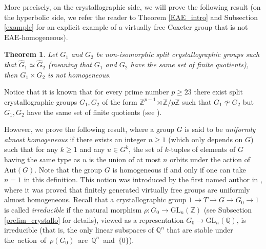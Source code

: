 \documentclass[a4paper, 11pt]{amsart}
\newtheorem{te}{Theorem}[section]
\theoremstyle{definition}
\theoremstyle{remark}
\renewcommand{\geq}{\geqslant}
\begin{document}

More precisely, on the crystallographic side, we will prove the following result (on the hyperbolic side, we refer the reader to Theorem \ref{EAE_intro} and Subsection \ref{example} for an explicit example of a virtually free Coxeter group that is not $\mathrm{EAE}$-homogeneous).

\begin{te}\label{counterexample_theorem}Let $G_1$ and $G_2$ be non-isomorphic split crystallographic groups such that $\widehat{G}_1\simeq \widehat{G}_2$ (meaning that $G_1$ and $G_2$ have the same set of finite quotients), then $G_1 \times G_2$ is not homogeneous.\end{te}

Notice that it is known that for every prime number $p \geq 23$ there exist split crystallographic groups $G_1,G_2$ of the form $\mathbb{Z}^{p-1} \rtimes\mathbb{Z}/p\mathbb{Z}$ such that $G_1\not\simeq G_2$ but $G_1,G_2$ have the same set of finite quotients (see \cite{bri,FNP}). 

\smallskip

However, we prove the following result, where a group $G$ is said to be \emph{uniformly almost homogeneous} if there exists an integer $n\geq 1$ (which only depends on $G$) such that for any $k\geq 1$ and any $u\in G^k$, the set of $k$-tuples of elements of $G$ having the same type as $u$ is the union of at most $n$ orbits under the action of $\mathrm{Aut}(G)$. Note that the group $G$ is homogeneous if and only if one can take $n=1$ in this definition. This notion was introduced by the first named author in \cite{And18b}, where it was proved that finitely generated virtually free groups are uniformly almost homogeneous. Recall that a crystallographic group $1\rightarrow T\rightarrow G\rightarrow G_0\rightarrow 1$ is called \emph{irreducible} if the natural morphism $\rho: G_0\rightarrow \mathrm{GL}_n(\mathbb{Z})$ (see Subsection \ref{prelim_crystallo} for details), viewed as a representation $G_0\rightarrow\mathrm{GL}_n(\mathbb{Q})$, is irreducible (that is, the only linear subspaces of $\mathbb{Q}^n$ that are stable under \mbox{the action of $\rho(G_0)$ are $\mathbb{Q}^n$ and $\lbrace 0\rbrace$).}
\end{document}
